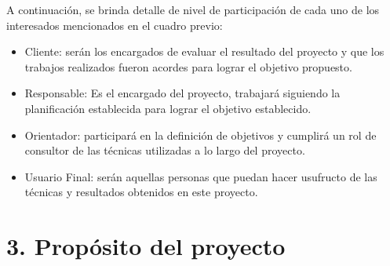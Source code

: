 \documentclass[
11pt, %
]{charter}
\begin{document}
%
%
%
%
% 
%

A continuación, se brinda detalle de nivel de participación de cada uno de los interesados mencionados en el cuadro previo:

\begin{itemize}
	\item Cliente: serán los encargados de evaluar el resultado del proyecto y que los trabajos realizados fueron acordes para lograr el objetivo propuesto. 
	\item Responsable: Es el encargado del proyecto, trabajará siguiendo la planificación establecida para lograr el objetivo establecido.
	\item Orientador: participará en la definición de objetivos y cumplirá un rol de consultor de las técnicas utilizadas a lo largo del proyecto.
	\item Usuario Final: serán aquellas personas que puedan hacer usufructo de las técnicas y resultados obtenidos en este proyecto.
\end{itemize}

\section{3. Propósito del proyecto}
\label{sec:proposito}

%
\end{document}
